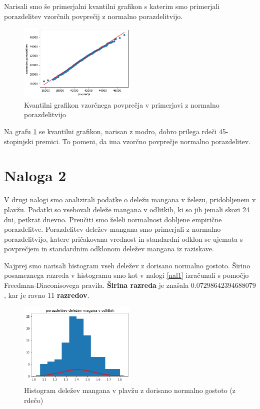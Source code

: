 \documentclass{article}
\begin{document}
Narisali smo še primerjalni kvantilni grafikon s katerim smo primerjali porazdelitev vzorčnih povprečij z
normalno porazdelitvijo.
\begin{figure}[H]
    \begin{center}
        \includegraphics*[width=0.5\textwidth]{figure1G(1).png}
        \caption{Kvantilni grafikon vzorčnega povprečja v primerjavi z normalno porazdelitvijo }
        \label{QQvzor}
    \end{center}
\end{figure}
Na grafu \ref*{QQvzor} se kvantilni grafikon, narisan z modro, dobro prilega rdeči 45-stopinjski premici.
To pomeni, da ima vzorčno povprečje normalno porazdelitev.



\section{Naloga 2}

V drugi nalogi smo analizirali podatke o deležu mangana v železu, pridobljenem v plavžu.
Podatki so vsebovali deleže mangana v odlitkih, ki so jih jemali skozi 24 dni, petkrat dnevno.
Preučiti smo želeli normalnost dobljene empirične porazdelitve. Porazdelitev deležev
mangana smo primerjali z normalno porazdelitvijo, katere pričakovana vrednost in standardni odklon
se ujemata s povprečjem in standardnim odklonom deležev mangana iz raziskave.

Najprej smo narisali histogram vseh deležev z dorisano normalno gostoto. Širino posameznega razreda v histogramu 
smo kot v nalogi \ref{nal1} izračunali s pomočjo Freedman-Diaconisovega pravila. \textbf{Širina razreda} je znašala
$0.07298642394688079$, kar je ravno $11$ \textbf{razredov}.

\begin{figure}[H]
    \begin{center}
        \includegraphics*[width=0.5\textwidth]{figure2A.png}
        \caption{Histogram deležev mangana v plavžu z dorisano normalno gostoto (z rdečo)}
        \label{2A}
    \end{center}
\end{figure}
\end{document}
